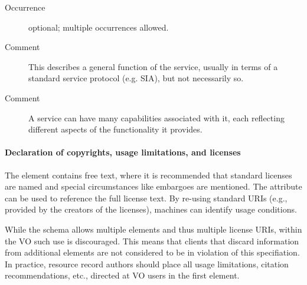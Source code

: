 \documentclass[11pt,a4paper]{ivoa}
\begin{document}
\begin{generated}
\begin{bigdescription}
\begin{description}
\item[Occurrence] optional; multiple occurrences allowed.
\item[Comment] 
                        This describes a general function of the
                        service, usually in terms of a standard
                        service protocol (e.g. SIA), but not
                        necessarily so.
                     
\item[Comment] 
                        A service can have many capabilities
                        associated with it, each reflecting different
                        aspects of the functionality it provides.  
                     

\end{description}


\end{bigdescription}\endgroup

\endgroup
\end{generated}


\paragraph{Declaration of copyrights, usage limitations, and licenses}

The  element contains free text, where it is recommended
that standard licenses are named and special circumstances like embargoes
are mentioned.  The  attribute can be used to
reference the
full license text.  By re-using standard URIs (e.g., provided by the
creators of the licenses), machines can
identify usage conditions.

While the schema allows multiple  elements and thus
multiple license URIs, within the VO such use is discouraged.  This
means that clients that discard information from additional
 elements are not considered to be in violation of this
specifiation.  In practice, resource record authors should place all
usage limitations, citation recommendations, etc., directed at VO users
in the first  element.
\end{document}
